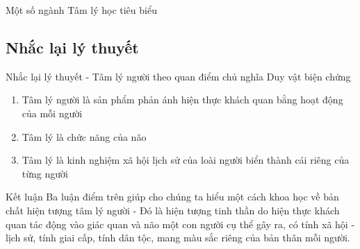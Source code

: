 \documentclass[../main.tex]{subfiles}
\begin{document}
\begin{frame}{Một số ngành Tâm lý học tiêu biểu}
	\centering
\end{frame}
\subsection{Nhắc lại lý thuyết}
\begin{frame}{Nhắc lại lý thuyết - Tâm lý người theo quan điểm chủ nghĩa Duy vật biện chứng}
    \begin{enumerate}
        \item Tâm lý người là sản phẩm phản ánh hiện thực khách quan bằng hoạt động của mỗi người
        \item Tâm lý là chức năng của não
        \item Tâm lý là kinh nghiệm xã hội lịch sử của loài người biển thành cái riêng của từng người
    \end{enumerate}
    \begin{alertblock}{Kết luận}
        Ba luận điểm trên giúp cho chúng ta hiểu một cách khoa học về bản chất hiện tượng tâm lý người - Đó là hiện tượng tinh thần do hiện thực khách quan tác động vào giác quan và não một con người cụ thể gây ra, có tính xã hội - lịch sử, tính giai cấp, tính dân tộc, mang màu sắc riêng của bản thân mỗi người.
    \end{alertblock}
\end{frame}
\end{document}
